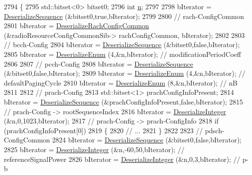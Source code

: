 \begin{DoxyCode}
2794 \{
2795   std::bitset<0> bitset0;
2796   \textcolor{keywordtype}{int} \hyperlink{namespacesample-rng-plot_aeb5ee5c431e338ef39b7ac5431242e1d}{n};
2797 
2798   bIterator = \hyperlink{classns3_1_1Asn1Header_a58c68bb97ba3fe2e8fcdd7c208d672b2}{DeserializeSequence} (&bitset0,\textcolor{keyword}{true},bIterator);
2799 
2800   \textcolor{comment}{// rach-ConfigCommon}
2801   bIterator = \hyperlink{classns3_1_1RrcAsn1Header_a4fb01dd5cdf7fce787facd85783c812a}{DeserializeRachConfigCommon} (&radioResourceConfigCommonSib->
      rachConfigCommon, bIterator);
2802 
2803   \textcolor{comment}{// bcch-Config }
2804   bIterator = \hyperlink{classns3_1_1Asn1Header_a58c68bb97ba3fe2e8fcdd7c208d672b2}{DeserializeSequence} (&bitset0,\textcolor{keyword}{false},bIterator);
2805   bIterator = \hyperlink{classns3_1_1Asn1Header_a4fcc253e0eec3483c775b005c1875f2d}{DeserializeEnum} (4,&n,bIterator); \textcolor{comment}{// modificationPeriodCoeff}
2806 
2807   \textcolor{comment}{// pcch-Config }
2808   bIterator = \hyperlink{classns3_1_1Asn1Header_a58c68bb97ba3fe2e8fcdd7c208d672b2}{DeserializeSequence} (&bitset0,\textcolor{keyword}{false},bIterator);
2809   bIterator = \hyperlink{classns3_1_1Asn1Header_a4fcc253e0eec3483c775b005c1875f2d}{DeserializeEnum} (4,&n,bIterator); \textcolor{comment}{// defaultPagingCycle}
2810   bIterator = \hyperlink{classns3_1_1Asn1Header_a4fcc253e0eec3483c775b005c1875f2d}{DeserializeEnum} (8,&n,bIterator); \textcolor{comment}{// nB}
2811 
2812   \textcolor{comment}{// prach-Config }
2813   std::bitset<1> prachConfigInfoPresent;
2814   bIterator = \hyperlink{classns3_1_1Asn1Header_a58c68bb97ba3fe2e8fcdd7c208d672b2}{DeserializeSequence} (&prachConfigInfoPresent,\textcolor{keyword}{false},bIterator);
2815   \textcolor{comment}{// prach-Config -> rootSequenceIndex}
2816   bIterator = \hyperlink{classns3_1_1Asn1Header_a49802c9af30018b078150e866b6ecae2}{DeserializeInteger} (&n,0,1023,bIterator);
2817   \textcolor{comment}{// prach-Config -> prach-ConfigInfo}
2818   \textcolor{keywordflow}{if} (prachConfigInfoPresent[0])
2819     \{
2820       \textcolor{comment}{// ...}
2821     \}
2822 
2823   \textcolor{comment}{// pdsch-ConfigCommon }
2824   bIterator = \hyperlink{classns3_1_1Asn1Header_a58c68bb97ba3fe2e8fcdd7c208d672b2}{DeserializeSequence} (&bitset0,\textcolor{keyword}{false},bIterator);
2825   bIterator = \hyperlink{classns3_1_1Asn1Header_a49802c9af30018b078150e866b6ecae2}{DeserializeInteger} (&n,-60,50,bIterator); \textcolor{comment}{// referenceSignalPower}
2826   bIterator = \hyperlink{classns3_1_1Asn1Header_a49802c9af30018b078150e866b6ecae2}{DeserializeInteger} (&n,0,3,bIterator); \textcolor{comment}{// p-b}

\end{DoxyCode}
